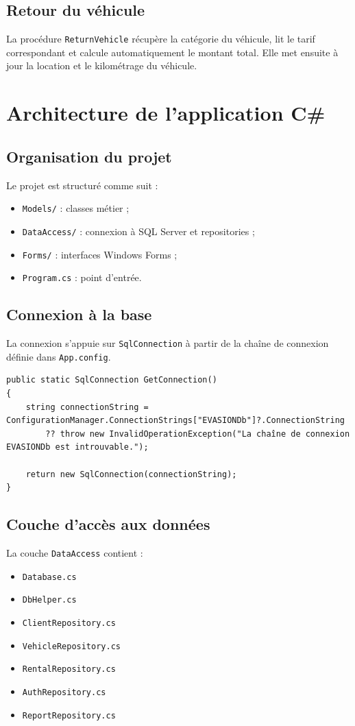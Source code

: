 \documentclass[12pt,a4paper]{report}
\begin{document}
\section{Retour du véhicule}
La procédure \texttt{ReturnVehicle} récupère la catégorie du véhicule, lit le tarif correspondant et calcule automatiquement le montant total. Elle met ensuite à jour la location et le kilométrage du véhicule.

\chapter{Architecture de l'application C\#}
\section{Organisation du projet}
Le projet est structuré comme suit :
\begin{itemize}[leftmargin=1.2cm]
    \item \texttt{Models/} : classes métier ;
    \item \texttt{DataAccess/} : connexion à SQL Server et repositories ;
    \item \texttt{Forms/} : interfaces Windows Forms ;
    \item \texttt{Program.cs} : point d'entrée.
\end{itemize}

\section{Connexion à la base}
La connexion s'appuie sur \texttt{SqlConnection} à partir de la chaîne de connexion définie dans \texttt{App.config}.

\begin{lstlisting}[language={[Sharp]C},caption={Connexion SQL Server}]
public static SqlConnection GetConnection()
{
    string connectionString = ConfigurationManager.ConnectionStrings["EVASIONDb"]?.ConnectionString
        ?? throw new InvalidOperationException("La chaîne de connexion EVASIONDb est introuvable.");

    return new SqlConnection(connectionString);
}
\end{lstlisting}

\section{Couche d'accès aux données}
La couche \texttt{DataAccess} contient :
\begin{itemize}[leftmargin=1.2cm]
    \item \texttt{Database.cs}
    \item \texttt{DbHelper.cs}
    \item \texttt{ClientRepository.cs}
    \item \texttt{VehicleRepository.cs}
    \item \texttt{RentalRepository.cs}
    \item \texttt{AuthRepository.cs}
    \item \texttt{ReportRepository.cs}
\end{itemize}
\end{document}
